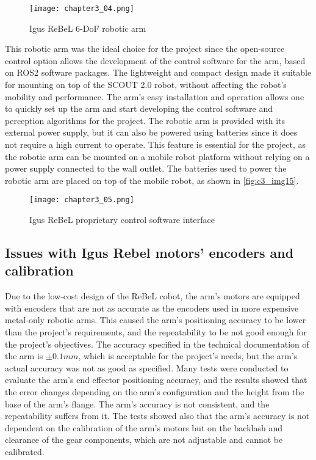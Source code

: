 \begin{figure}[t]
    \centering
    \texttt{[image: chapter3\_04.png]}
    \captionsetup{width=1\linewidth}
    \caption{Igus ReBeL 6-DoF robotic arm}
    \label{fig:c3_img04}
\end{figure}

This robotic arm was the ideal choice for the project since the open-source control option allows the development of
the control software for the arm, based on ROS2 software packages. The lightweight and compact design made it suitable
for mounting on top of the SCOUT 2.0 robot, without affecting the robot's mobility and performance. 
The arm's easy installation and operation allows one to quickly set up the arm and start developing the control software
and perception algorithms for the project. The robotic arm is provided with its external power supply, but it can also be 
powered using batteries since it does not require a high current to operate. This feature is essential for the project,
as the robotic arm can be mounted on a mobile robot platform without relying on a power supply connected to the wall outlet.
The batteries used to power the robotic arm are placed on top of the mobile robot, as shown in \ref{fig:c3_img15}.

\begin{figure}[t]
    \centering
    \texttt{[image: chapter3\_05.png]}
    \captionsetup{width=1\linewidth}
    \caption{Igus ReBeL proprietary control software interface}
    \label{fig:c3_img05}
\end{figure}



\subsection*{Issues with Igus Rebel motors' encoders and calibration}

Due to the low-cost design of the ReBeL cobot, the arm's motors are equipped with encoders that are not as accurate
as the encoders used in more expensive metal-only robotic arms. This caused the arm's positioning accuracy to be lower than
the project's requirements, and the repeatability to be not good enough for the project's objectives.
The accuracy specified in the technical documentation of the arm is $\pm 0.1mm$, which is acceptable for the project's
needs, but the arm's actual accuracy was not as good as specified. Many tests were conducted to evaluate the arm's
end effector positioning accuracy, and the results showed that the error changes depending on the arm's configuration
and the height from the base of the arm's flange. The arm's accuracy is not consistent, and the repeatability
suffers from it. The tests showed also that the arm's accuracy is not dependent on the calibration of the arm's motors
but on the backlash and clearance of the gear components, which are not adjustable and cannot be calibrated.

